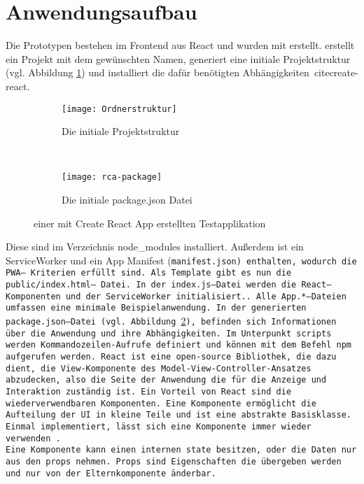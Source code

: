 \section{Anwendungsaufbau}
Die Prototypen bestehen im Frontend aus React und wurden mit  erstellt.  erstellt ein Projekt mit dem gewünschten Namen, generiert eine initiale Projektstruktur (vgl. Abbildung \ref{fig:init}) und installiert die dafür benötigten Abhängigkeiten~cite{create-react}.
\begin{figure}[H]
  \centering
  \begin{subfigure}[t]{0.4\textwidth}
          \texttt{[image: Ordnerstruktur]}
          \caption{Die initiale Projektstruktur}
          \label{fig:init}
  \end{subfigure}
  ~ 
  \begin{subfigure}[t]{0.4\textwidth}
          \texttt{[image: rca-package]}
          \caption{Die initiale package.json Datei}
          \label{fig:init2}
  \end{subfigure}
  \grayRule
  \caption[Create React App: initiale Testapplikation]{einer mit Create React App erstellten Testapplikation}
  \label{fig:create-react-app}
\end{figure}
Diese sind im Verzeichnis node\_modules installiert.
Außerdem ist ein ServiceWorker und ein App Manifest (\tt{manifest.json}) enthalten, wodurch die \gls{PWA}-- Kriterien erfüllt sind.
Als Template gibt es nun die \tt{public/index.html}-- Datei. In der \tt{index.js}--Datei werden die React--Komponenten und der ServiceWorker initialisiert.. Alle \tt{App.*}--Dateien umfassen eine minimale Beispielanwendung.
In der generierten \tt{package.json}--Datei (vgl. Abbildung \ref{fig:init2}), befinden sich Informationen über die Anwendung und ihre Abhängigkeiten. Im Unterpunkt \tt{scripts} werden Kommandozeilen-Aufrufe definiert und können mit dem Befehl \tt{npm} aufgerufen werden.
%
%
React ist eine open-source Bibliothek, die dazu dient, die View-Komponente des Model-View-Controller-Ansatzes abzudecken, also die Seite der Anwendung die für die Anzeige und Interaktion zuständig ist. Ein Vorteil von React sind die wiederverwendbaren Komponenten. Eine Komponente ermöglicht die Aufteilung der \gls{UI} in kleine Teile und ist eine abstrakte Basisklasse. Einmal implementiert, lässt sich eine Komponente immer wieder verwenden~\cite{react}.\\
Eine Komponente kann einen internen \tt{state} besitzen, oder die Daten nur aus den \tt{props} nehmen. \tt{Props} sind Eigenschaften die übergeben werden und nur von der Elternkomponente änderbar.
